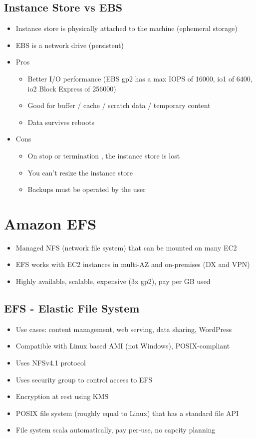 \subsection{Instance Store vs EBS}
\begin{itemize}
    \item Instance store is physically attached to the machine (ephemeral storage)
    \item EBS is a network drive (persistent)
    \item Pros
    \begin{itemize}
        \item Better I/O performance (EBS gp2 has a max IOPS of 16000, io1 of 6400, io2 Block Express of 256000)
        \item Good for buffer / cache / scratch data / temporary content
        \item Data survives reboots
    \end{itemize}
    \item Cons
    \begin{itemize}
        \item On stop or termination , the instance store is lost
        \item You can't resize the instance store
        \item Backups must be operated by the user
    \end{itemize}
\end{itemize}


\section{Amazon EFS}
\begin{itemize}
    \item Managed NFS (network file system) that can be mounted on many EC2
    \item EFS works with EC2 instances in multi-AZ and on-premises (DX and VPN)
    \item Highly available, scalable, expensive (3x gp2), pay per GB used
\end{itemize}

\subsection{EFS - Elastic File System}
\begin{itemize}
    \item Use cases: content management, web serving, data sharing, WordPress
    \item Compatible with Linux based AMI (not Windows), POSIX-compliant
    \item Uses NFSv4.1 protocol
    \item Uses security group to control access to EFS
    \item Encryption at rest using KMS
    \item POSIX file system (roughly equal to Linux) that has a standard file API
    \item File system scala automatically, pay per-use, no capcity planning
\end{itemize}

